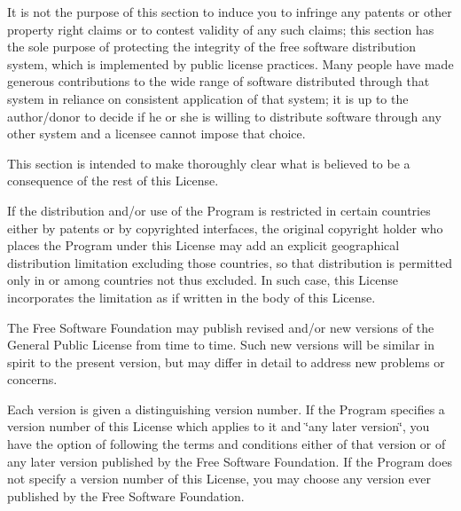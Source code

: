 It is not the purpose of this section to induce you to infringe any patents or other property right claims or to contest validity of any such claims; this section has the sole purpose of protecting the integrity of the free software distribution system, which is implemented by public license practices. Many people have made generous contributions to the wide range of software distributed through that system in reliance on consistent application of that system; it is up to the author/donor to decide if he or she is willing to distribute software through any other system and a licensee cannot impose that choice.

This section is intended to make thoroughly clear what is believed to be a consequence of the rest of this License.


\begin{DoxyEnumerate}
\item If the distribution and/or use of the Program is restricted in certain countries either by patents or by copyrighted interfaces, the original copyright holder who places the Program under this License may add an explicit geographical distribution limitation excluding those countries, so that distribution is permitted only in or among countries not thus excluded. In such case, this License incorporates the limitation as if written in the body of this License.
\item The Free Software Foundation may publish revised and/or new versions of the General Public License from time to time. Such new versions will be similar in spirit to the present version, but may differ in detail to address new problems or concerns.
\end{DoxyEnumerate}

Each version is given a distinguishing version number. If the Program specifies a version number of this License which applies to it and \char`\"{}any
later version\char`\"{}, you have the option of following the terms and conditions either of that version or of any later version published by the Free Software Foundation. If the Program does not specify a version number of this License, you may choose any version ever published by the Free Software Foundation.


